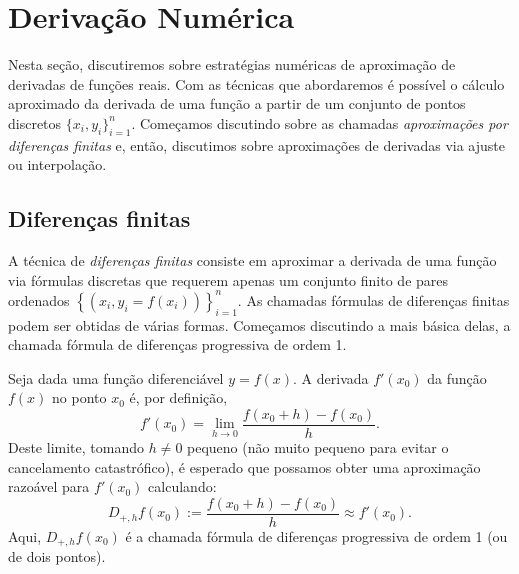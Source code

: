 
%

\chapter{Derivação Numérica}

Nesta seção, discutiremos sobre estratégias numéricas de aproximação de derivadas de funções reais. Com as técnicas que abordaremos é possível o cálculo aproximado da derivada de uma função a partir de um conjunto de pontos discretos $\{x_i, y_i\}_{i=1}^n$. Começamos discutindo sobre as chamadas \emph{aproximações por diferenças finitas} e, então, discutimos sobre aproximações de derivadas via ajuste ou interpolação.

\section{Diferenças finitas}

A técnica de \emph{diferenças finitas} consiste em aproximar a derivada de uma função via fórmulas discretas que requerem apenas um conjunto finito de pares ordenados $\left\{\left(x_i, y_i=f(x_i)\right)\right\}_{i=1}^n$. As chamadas fórmulas de diferenças finitas podem ser obtidas de várias formas. Começamos discutindo a mais básica delas, a chamada fórmula de diferenças progressiva de ordem 1.

Seja dada uma função diferenciável $y = f(x)$. A derivada $f'(x_0)$ da função $f(x)$ no ponto $x_0$ é, por definição,
\begin{equation*}
  f'(x_0)=\lim_{h\to 0}\frac{f(x_0+h)-f(x_0)}{h}.
\end{equation*}
Deste limite, tomando $h\neq 0$ pequeno (não muito pequeno para evitar o cancelamento catastrófico), é esperado que possamos obter uma aproximação razoável para $f'(x_0)$ calculando:
\begin{equation}\label{eq:dp}
  D_{+,h}f(x_0) := \frac{f(x_0+h)-f(x_0)}{h} \approx f'(x_0).
\end{equation}
Aqui, $D_{+,h}f(x_0)$ é a chamada fórmula de diferenças progressiva de ordem 1 (ou de dois pontos).

